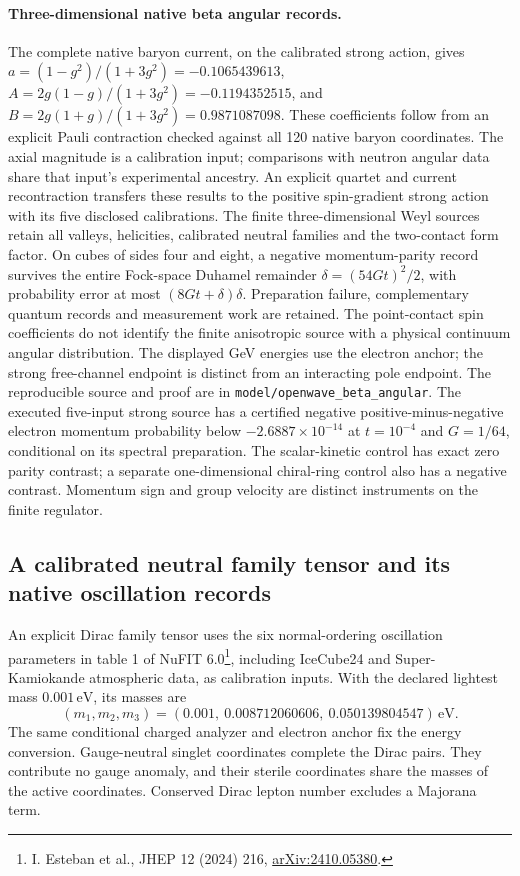 \paragraph{Three-dimensional native beta angular records.}
The complete native baryon current, on the calibrated strong action, gives
\(a=(1-g^2)/(1+3g^2)=-0.1065439613\),
\(A=2g(1-g)/(1+3g^2)=-0.1194352515\), and
\(B=2g(1+g)/(1+3g^2)=0.9871087098\).
These coefficients follow from an explicit Pauli contraction checked against
all 120 native baryon coordinates. The axial magnitude is a calibration input;
comparisons with neutron angular data share that input's experimental ancestry.
An explicit quartet and current recontraction transfers these results to
the positive spin-gradient strong action with its five disclosed calibrations.
The finite three-dimensional Weyl sources retain all valleys, helicities,
calibrated neutral families and the two-contact form factor.
On cubes of sides four and eight, a negative momentum-parity record survives
the entire Fock-space Duhamel remainder
\(\delta=(54Gt)^2/2\), with probability error at most
\((8Gt+\delta)\delta\). Preparation failure, complementary quantum records
and measurement work are retained. The point-contact spin coefficients do
not identify the finite anisotropic source with a physical continuum angular
distribution. The displayed GeV energies use the electron anchor; the strong
free-channel endpoint is distinct from an interacting pole endpoint.
The reproducible source and proof are in \texttt{model/openwave\_beta\_angular}.
The executed five-input strong source has a certified negative
positive-minus-negative electron momentum probability below
$-2.6887\times10^{-14}$ at $t=10^{-4}$ and $G=1/64$, conditional on
its spectral preparation. The scalar-kinetic control has exact zero
parity contrast; a separate one-dimensional chiral-ring control also
has a negative contrast. Momentum sign and group velocity are distinct
instruments on the finite regulator.


\subsection{A calibrated neutral family tensor and its native oscillation records}
\label{sec:calibrated-neutral-records}
An explicit Dirac family tensor uses the six normal-ordering oscillation parameters in table 1 of NuFIT 6.0\footnote{I. Esteban et al., JHEP 12 (2024) 216, \href{https://arxiv.org/abs/2410.05380}{arXiv:2410.05380}.}, including IceCube24 and Super-Kamiokande atmospheric data, as calibration inputs. With the declared lightest mass $0.001\,\mathrm{eV}$, its masses are
\[
(m_1,m_2,m_3)=(0.001,\ 0.008712060606,\ 0.050139804547)\,\mathrm{eV}.
\]
The same conditional charged analyzer and electron anchor fix the energy conversion. Gauge-neutral singlet coordinates complete the Dirac pairs. They contribute no gauge anomaly, and their sterile coordinates share the masses of the active coordinates. Conserved Dirac lepton number excludes a Majorana term.

